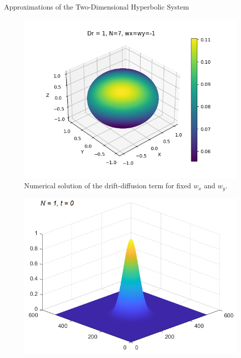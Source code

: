 \begin{frame}{Approximations of the Two-Dimensional Hyperbolic System}
\begin{figure}[H]
\begin{minipage}{0.4\textwidth}
				\includegraphics[scale=0.23]{Bilder_wxwy/Sol_onSphere_wx=-1=wy_Dr=1_N=7}
			\end{minipage}
			\caption{Numerical solution of the drift-diffusion term for fixed $w_x$ and $w_y$.}
		\end{figure}
		\begin{figure}[H]
			\centering
			\begin{minipage}{0.4\textwidth}
				\includegraphics[scale=0.23]{Bilder_wxwy/t=0_wxwy=1_wxwy=-1}
			\end{minipage}
			\hfill 
			\begin{minipage}{0.4\textwidth}

\end{minipage}
\end{figure}
\end{frame}
